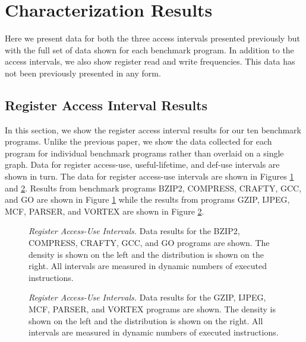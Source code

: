 \documentclass[10pt,dvips]{article}
\begin{document}
\section{Characterization Results}
%
Here we present data for both the three access intervals
presented previously but with the full set of data shown
for each benchmark program.
In addition to the access intervals, we also show register
read and write frequencies.  This data has not been previously
presented in any form.
%
\subsection{Register Access Interval Results}
%
In this section, we show the register access interval results for
our ten benchmark programs.
Unlike the previous paper, we show the data collected
for each program for individual benchmark programs 
rather than overlaid on a single graph.  
Data
for register access-use, useful-lifetime, and def-use intervals
are shown in turn.
%
%
The data for register access-use intervals are
shown in Figures \ref{fig:aa_rrint} 
and \ref{fig:ab_rrint}.
Results from benchmark programs BZIP2, COMPRESS, CRAFTY, GCC, and GO
are shown in Figure \ref{fig:aa_rrint} while the results
from programs GZIP, IJPEG, MCF, PARSER, and VORTEX are shown in
Figure \ref{fig:ab_rrint}.
%
\begin{figure}
\centering
{}
\caption{{\em Register Access-Use Intervals.} 
Data results for the 
BZIP2, COMPRESS, CRAFTY, GCC, and GO programs are shown.
The density is shown on the left and the distribution is shown
on the right.
All intervals are measured in dynamic numbers of executed instructions.}
\label{fig:aa_rrint}
\end{figure}
%
\begin{figure}
\centering
{}
\caption{{\em Register Access-Use Intervals.} 
Data results for the
GZIP, IJPEG, MCF, PARSER, and VORTEX programs are shown.
The density is shown on the left and the distribution is shown
on the right.
All intervals are measured in dynamic numbers of executed instructions.}
\label{fig:ab_rrint}
\end{figure}
%
%
\end{document}
